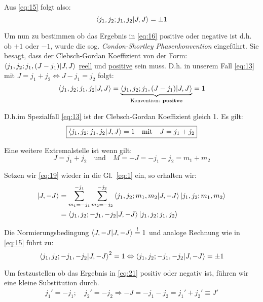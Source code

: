 Aus \eqref{eq:15} folgt also:
\begin{equation}
  \label{eq:16}
  \braket{j_1,j_2;j_1,j_2}{J,J}=\pm 1
\end{equation}

Um nun zu bestimmen ob das Ergebnis in \eqref{eq:16} positive oder negative ist
d.h. ob \(+1\) oder \(-1\), wurde die sog. \emph{Condon-Shortley
  Phasenkonvention} eingeführt. Sie besagt, dass der Clebsch-Gordan Koeffizient
von der Form:\\
\(\braket{j_1,j_2;j_1,(J-j_1)}{J,J}\) \underline{reell} und \underline{positive}
sein muss. D.h. in unserem Fall \eqref{eq:13} mit \(J=j_1+j_2 \Leftrightarrow
J-j_1=j_2\) folgt:
\begin{equation}
  \label{eq:17}
  \braket{j_1,j_2;j_1,j_2}{J,J}=\underbr{\braket{j_1,j_2;j_1,(J-j_1)}{J,J}}
  _{\text{Konvention: \textbf{positve}}}=1
\end{equation}

D.h.im Spezialfall \eqref{eq:13} ist der Clebsch-Gordan Koeffizient gleich 1. Es
gilt:
\begin{equation}
  \label{eq:18}
  \boxed{\braket{j_1,j_2;j_1,j_2}{J,J}=1 \quad \text{mit}\quad J=j_1+j_2}
\end{equation}

Eine weitere Extremalstelle ist wenn gilt:
\begin{equation}
  \label{eq:19}
    J=j_1+j_2 \quad \text{und} \quad M=-J=-j_1-j_2=m_1+m_2
\end{equation}

Setzen wir \eqref{eq:19} wieder in die Gl.~\eqref{eq:1} ein, so erhalten wir:
\begin{align}
  \label{eq:20}
     \ket{J,-J}&=\sum_{m_1=-j_1}^{-j_1}\sum_{m_2=-j_2}^{-j_2} 
   \braket{j_1,j_2;m_1,m_2}{J,-J}
   \ket{j_1,j_2;m_1,m_2}\notag\\
   &= \braket{j_1,j_2;-j_1,-j_2}{J,-J}
   \ket{j_1,j_2;j_1,j_2}
\end{align}

Die Normierungsbedingung \(\braket{J,-J}{J,-J}\stackrel{!}=1\) und analoge
Rechnung wie in \eqref{eq:15} führt zu:
\begin{equation}
  \label{eq:21}
  \braket{j_1,j_2;-j_1,-j_2}{J,-J}^2=1
  \Leftrightarrow \braket{j_1,j_2;-j_1,-j_2}{J,-J}=\pm 1
\end{equation}

Um festzustellen ob das Ergebnis in \eqref{eq:21} positiv oder negativ ist,
führen wir eine kleine Substitution durch.
\begin{align}
  \label{eq:22}
  j_1'=-j_1; \quad j_2'=-j_2
  \Rightarrow -J=-j_1-j_2=j_1'+j_2'\equiv J'
\end{align}

